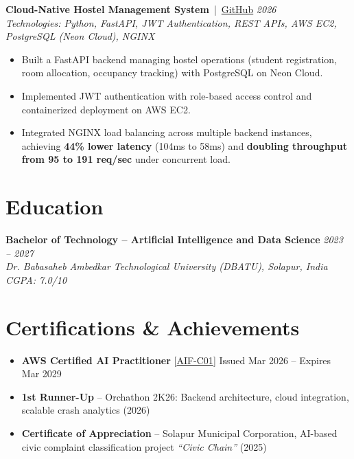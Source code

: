 \documentclass[11pt,a4paper]{article}
\begin{document}
\textbf{Cloud-Native Hostel Management System} \,|\,
\href{https://github.com/raza-shaikh-ai/hostel-management-CRUD}{GitHub}
\hfill \textit{2026} \\
\textit{Technologies: Python, FastAPI, JWT Authentication, REST APIs, AWS EC2, PostgreSQL (Neon Cloud), NGINX}
\begin{itemize}
    \item Built a FastAPI backend managing hostel operations (student registration, room allocation, occupancy tracking) with PostgreSQL on Neon Cloud.
    \item Implemented JWT authentication with role-based access control and containerized deployment on AWS EC2.
    \item Integrated NGINX load balancing across multiple backend instances, achieving \textbf{44\% lower latency} (104ms to 58ms) and \textbf{doubling throughput from 95 to 191 req/sec} under concurrent load.
\end{itemize}

\vspace{-14pt}
\section*{Education}
\vspace{-5pt}
\noindent\textbf{Bachelor of Technology -- Artificial Intelligence and Data Science} \hfill \textit{2023 -- 2027} \\
\textit{Dr. Babasaheb Ambedkar Technological University (DBATU), Solapur, India} \hfill \textit{CGPA: 7.0/10}

\vspace{-14pt}
\section*{Certifications \& Achievements}
\begin{itemize}
    \item \textbf{AWS Certified AI Practitioner} [\href{https://www.credly.com/badges/54f5cf90-586c-4237-872c-1870397088a0}{AIF-C01}] \hfill {\small Issued Mar 2026 -- Expires Mar 2029}
    \item \textbf{1st Runner-Up} -- Orchathon 2K26: Backend architecture, cloud integration, scalable crash analytics (2026)
    \item \textbf{Certificate of Appreciation} -- Solapur Municipal Corporation, AI-based civic complaint classification project \textit{``Civic Chain''} (2025)
\end{itemize}
\end{document}
